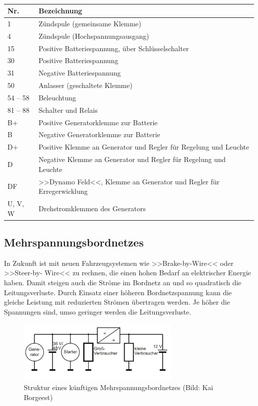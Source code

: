 \begin{table}[!ht]%
\centering 
	\caption{}%
\begin{tabular}{@{}ll@{}}
\hline
\textbf{Nr.} & \textbf{Bezeichnung} \\
\hline
1 & Zündspule (gemeinsame Klemme) \\
4 & Zündspule (Hochspannungsausgang) \\
15 & Positive Batteriespannung, über Schlüsselschalter \\
30 & Positive Batteriespannung \\
31 & Negative Batteriespannung \\
50 & Anlasser (geschaltete Klemme) \\
54 -- 58 & Beleuchtung \\
81 -- 88 & Schalter und Relais \\
B+ & Positive Generatorklemme zur Batterie \\
B & Negative Generatorklemme zur Batterie \\
D+ & Positive Klemme an Generator und Regler für Regelung und Leuchte \\
D & Negative Klemme an Generator und Regler für Regelung und Leuchte \\
DF & >>Dynamo Feld<<, Klemme an Generator und Regler für
Erregerwicklung \\
U, V, W & Drehstromklemmen des Generators \\
\hline
\end{tabular} 
\end{table}

\newpage

\subsection{Mehrspannungsbordnetzes}\label{mehrspannungsbordnetzes}

In Zukunft ist mit neuen Fahrzeugsystemen wie >>Brake-by-Wire<< oder
>>Steer-by- Wire<< zu rechnen, die einen hohen Bedarf an elektrischer
Energie haben. Damit steigen auch die Ströme im Bordnetz an und so
quadratisch die Leitungsverluste. Durch Einsatz einer höheren
Bordnetzspannung kann die gleiche Leistung mit reduzierten Strömen
übertragen werden. Je höher die Spannungen sind, umso geringer werden
die Leitungsverluste.

\begin{figure}[!ht]%
\centering
\includegraphics[width=0.7\textwidth]{images/CAN/CAN-2.pdf}
\caption{Struktur eines künftigen Mehrspannungsbordnetzes (Bild: Kai
Borgeest)}
\end{figure}

